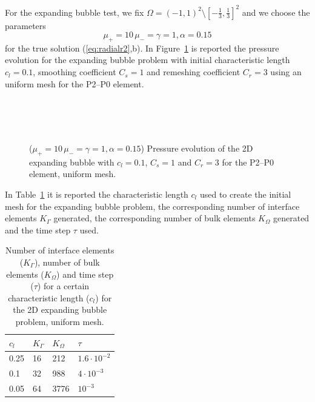 \documentclass[a4paper,12pt,onecolumn]{article}
\begin{document}
For the expanding bubble test, we fix $\Omega = (-1,1)^2 \setminus
[-\frac13,\frac13]^2$ and we choose the parameters
\begin{equation*}
\mu_+ = 10\,\mu_- = \gamma = 1,\alpha = 0.15
\end{equation*}
for the true solution (\ref{eq:radialr2},b). In
Figure~\ref{fig:expanding_bubble_uniform} is reported the pressure evolution for
the expanding bubble problem with initial characteristic length $c_l=0.1$,
smoothing coefficient $C_s=1$ and remeshing coefficient $C_r=3$ using an uniform
mesh for the P2--P0 element.
\begin{figure}[htbp]
  \centering
  \\
  \quad
  \\
  \quad
  \\
 \caption{($\mu_+ = 10\,\mu_- = \gamma = 1,\alpha = 0.15$) Pressure evolution
of the 2D expanding bubble with $c_l=0.1$, $C_s=1$ and $C_r=3$ for the P2--P0
element, uniform mesh.}
  \label{fig:expanding_bubble_uniform}
\end{figure}

In Table~\ref{tab:expandingbubble2Delements} it is reported the characteristic
length $c_l$ used to create the initial mesh for the expanding bubble problem,
the corresponding number of interface elements $K_\Gamma$ generated, the
corresponding number of bulk elements $K_\Omega$ generated and the time step
$\tau$ used.
\begin{table}
 \center
\begin{tabular}{llll}
\hline
$c_l$ & $K_\Gamma$ & $K_\Omega$ & $\tau$\\
\hline
0.25 & 16 & 212 & $1.6\cdot10^{-2}$ \\
0.1 & 32 & 988 & $4\cdot10^{-3}$ \\
0.05 & 64 & 3776 & $10^{-3}$ \\
\hline
\end{tabular}
\caption{Number of interface elements ($K_\Gamma$), number of bulk elements
($K_\Omega$) and time step ($\tau$) for a certain characteristic length ($c_l$)
for the 2D expanding bubble problem, uniform mesh.}
\label{tab:expandingbubble2Delements}
\end{table}
\end{document}
